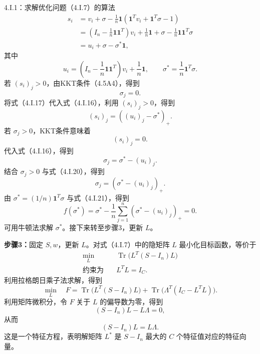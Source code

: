 \begin{bookalgorithm}{4.I.1：求解优化问题（4.I.7）的算法}
\begin{equation}
\begin{aligned}
s_i&=v_i+\sigma-\frac1n\mathbf1(\mathbf1^Tv_i+\mathbf1^T\sigma-1)\\
&=\left(I_n-\frac1n\mathbf1\mathbf1^T\right)v_i
+\frac1n\mathbf1+\sigma-\frac1n\mathbf1\mathbf1^T\sigma\\
&=u_i+\sigma-\sigma^*\mathbf1,
\end{aligned}\tag{4.I.16}
\end{equation}
其中
\[
u_i=\left(I_n-\frac1n\mathbf1\mathbf1^T\right)v_i+\frac1n\mathbf1,
\qquad\sigma^*=\frac1n\mathbf1^T\sigma.
\]
若 $(s_i)_j>0$，由KKT条件（4.5A4），得到
\begin{equation}
\sigma_j=0.\tag{4.I.17}
\end{equation}
将式（4.I.17）代入式（4.I.16），利用 $(s_i)_j>0$，得到
\begin{equation}
(s_i)_j=((u_i)_j-\sigma^*)_+.\tag{4.I.18}
\end{equation}
若 $\sigma_j>0$，KKT条件意味着
\begin{equation}
(s_i)_j=0.\tag{4.I.19}
\end{equation}
代入式（4.I.16），得到
\begin{equation}
\sigma_j=\sigma^*-(u_i)_j.\tag{4.I.20}
\end{equation}
结合 $\sigma_j>0$ 与式（4.I.20），得到
\begin{equation}
\sigma_j=(\sigma^*-(u_i)_j)_+.\tag{4.I.21}
\end{equation}
由 $\sigma^*=(1/n)\mathbf1^T\sigma$ 与式（4.I.21），得到
\begin{equation}
f(\sigma^*)=\sigma^*-\frac1n\sum_{j=1}^{n}
(\sigma^*-(u_i)_j)_+=0.\tag{4.I.22}
\end{equation}
可用牛顿法求解 $\sigma^*$。接下来转至步骤3，更新 $L$。

\textbf{步骤3：}固定 $S,w$，更新 $L$。对式（4.I.7）中的隐矩阵 $L$ 最小化目标函数，等价于
\begin{equation}
\begin{aligned}
\min_L\quad&\operatorname{Tr}\bigl(L^T(S-I_n)L\bigr)\\
\text{约束为}\quad&L^TL=I_C.
\end{aligned}\tag{4.I.23}
\end{equation}
利用拉格朗日乘子法求解，得到
\begin{equation}
\min_L\quad F=\operatorname{Tr}\bigl(L^T(S-I_n)L\bigr)
+\operatorname{Tr}\bigl(\Lambda^T(I_C-L^TL)\bigr).\tag{4.I.24}
\end{equation}
利用矩阵微积分，令 $F$ 关于 $L$ 的偏导数为零，得到
\[
(S-I_n)L-L\Lambda=0,
\]
从而
\begin{equation}
(S-I_n)L=L\Lambda.\tag{4.I.25}
\end{equation}
这是一个特征方程，表明解矩阵 $L^*$ 是 $S-I_n$ 最大的 $C$ 个特征值对应的特征向量。


\end{bookalgorithm}

